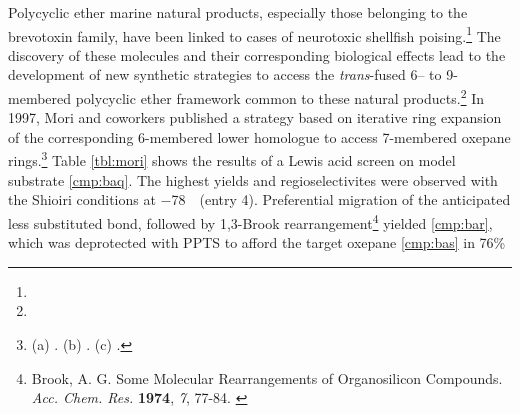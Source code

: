 Polycyclic ether marine natural products, especially those belonging to
the brevotoxin family, have been linked to
cases of neurotoxic shellfish poising.\footnote{} The discovery of these molecules and their
corresponding biological effects lead to the development of new synthetic
strategies to access the \textit{trans}-fused 6-- to 9-membered polycyclic ether
framework common to these natural products.\footnote{} In 1997, Mori and
coworkers published a strategy based on iterative ring expansion of the corresponding 6-membered lower homologue to access 7-membered oxepane rings.\footnote{(a) . (b) . (c)
.} Table
\ref{tbl:mori} shows the results of a Lewis acid screen on model substrate
\ref{cmp:baq}. The highest yields and regioselectivites were observed with the
Shioiri conditions at $-$78~\degc~(entry 4). Preferential
migration of the anticipated less substituted bond, followed by 1,3-Brook
rearrangement\footnote{{\frenchspacing Brook, A. G. Some Molecular Rearrangements of Organosilicon
Compounds. \textit{Acc. Chem. Res.} \textbf{1974}, \textit{7}, 77-84.} \label{ref:cbrook}} yielded
\ref{cmp:bar}, which was deprotected with PPTS to afford the target oxepane \ref{cmp:bas} in 76\%
